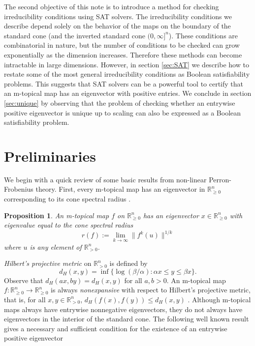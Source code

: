 \documentclass[10pt,reqno]{amsart}
\newcommand{\R}{\mathbb{R}}
\newcommand{\on}{\operatorname}
\theoremstyle{plain}
\newtheorem{proposition}[theorem]{Proposition}
\theoremstyle{definition}
\numberwithin{equation}{section}
\begin{document}
The second objective of this note is to introduce a method for checking irreducibility conditions using SAT solvers.  The irreducibility conditions we describe depend solely on the behavior of the maps on the boundary of the standard cone (and the inverted standard cone $(0,\infty]^n$). These conditions are combinatorial in nature, but the number of conditions to be checked can grow exponentially as the dimension increases.  Therefore these methods can become intractable in large dimensions.  However, in section \ref{sec:SAT} we describe how to restate some of the most general irreducibility conditions as Boolean satisfiability problems. This suggests that SAT solvers can be a powerful tool to certify that an m-topical map has an eigenvector with positive entries.  
We conclude in section \ref{sec:unique} by observing that the problem of checking whether an entrywise positive eigenvector is unique up to scaling can also be expressed as a Boolean satisfiability problem. 


\section{Preliminaries} \label{sec:pre}

We begin with a quick review of some basic results from non-linear Perron-Frobenius theory. First, every m-topical map has an eigenvector in $\R^n_{\ge 0}$ corresponding to its cone spectral radius \cite[Corollary 5.4.2]{LemmensNussbaum}. 

\begin{proposition} \label{prop:KR}
An m-topical map $f$ on $\R^n_{\ge 0}$ has an eigenvector $x \in \R^n_{\ge 0}$ with eigenvalue equal to the cone spectral radius
$$r(f) := \lim_{k \rightarrow \infty} \|f^k(u)\|^{1/k}$$
where $u$ is any element of $\R^n_{>0}$. 
\end{proposition}


\emph{Hilbert's projective metric} on $\R^n_{>0}$ is defined by 
$$d_H(x,y) = \inf \{\log (\beta/\alpha) : \alpha x \le y \le \beta x \}.$$
Observe that $d_H(ax, by) = d_H(x,y)$ for all $a, b > 0$.  
An m-topical map $f:\R^n_{\ge 0} \rightarrow \R^n_{\ge 0}$ is always \emph{nonexpansive} with respect to Hilbert's projective metric, that is, for all $x, y \in \R^n_{>0}$, $d_H(f(x), f(y)) \le d_H(x,y)$ \cite[Corollary 2.1.4]{LemmensNussbaum}.  %
Although m-topical maps always have entrywise nonnegative eigenvectors, they do not always have eigenvectors in the interior of the standard cone.  The following well known result gives a necessary and sufficient condition for the existence of an entrywise positive eigenvector \cite[Proposition 6.3.1]{LemmensNussbaum}
\end{document}
